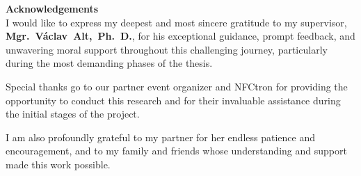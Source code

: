 \newpage
\pagestyle{empty}

\noindent
{\large\bfseries Acknowledgements}\\

\noindent
I would like to express my deepest and most sincere gratitude to my supervisor, \textbf{Mgr.~Václav~Alt,~Ph.~D.}, for his exceptional guidance, prompt feedback,
and unwavering moral support throughout this challenging journey, particularly during the most demanding phases of the thesis.

Special thanks go to our partner event organizer and NFCtron for providing the opportunity to conduct this research and for their invaluable assistance during the initial stages of the project.

I am also profoundly grateful to my partner for her endless patience and encouragement, and to my family and friends whose understanding and support made this work possible.